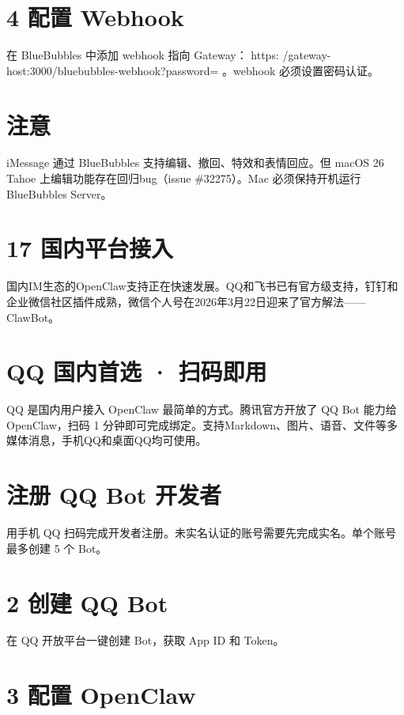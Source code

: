 \documentclass[
  10
]{article}
\begin{document}
\section{4 配置 Webhook}\label{ux914dux7f6e-webhook}

在 BlueBubbles 中添加 webhook 指向 Gateway： https:
/gateway-host:3000/bluebubbles-webhook?password= 。webhook
必须设置密码认证。

\section{注意}\label{ux6ce8ux610f-8}

iMessage 通过 BlueBubbles 支持编辑、撤回、特效和表情回应。但 macOS 26
Tahoe 上编辑功能存在回归bug（issue \#32275）。Mac 必须保持开机运行
BlueBubbles Server。

\section{17 国内平台接入}\label{ux56fdux5185ux5e73ux53f0ux63a5ux5165}

国内IM生态的OpenClaw支持正在快速发展。QQ和飞书已有官方级支持，钉钉和企业微信社区插件成熟，微信个人号在2026年3月22日迎来了官方解法------ClawBot。

\section{QQ 国内⾸选 ·
扫码即⽤}\label{qq-ux56fdux5185ux9009-ux626bux7801ux5373}

QQ 是国内用户接入 OpenClaw 最简单的方式。腾讯官方开放了 QQ Bot 能力给
OpenClaw，扫码 1
分钟即可完成绑定。支持Markdown、图片、语音、文件等多媒体消息，手机QQ和桌面QQ均可使用。

\section{注册 QQ Bot
开发者}\label{ux6ce8ux518c-qq-bot-ux5f00ux53d1ux8005}

用手机 QQ
扫码完成开发者注册。未实名认证的账号需要先完成实名。单个账号最多创建 5
个 Bot。

\section{2 创建 QQ Bot}\label{ux521bux5efa-qq-bot}

在 QQ 开放平台一键创建 Bot，获取 App ID 和 Token。

\section{3 配置 OpenClaw}\label{ux914dux7f6e-openclaw-2}
\end{document}
